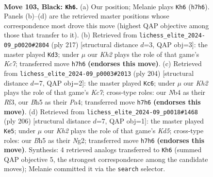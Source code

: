 \documentclass[11pt]{article}
\begin{document}
\clearpage

\begin{figure}[p]\centering
\begin{subfigure}{0.46\textwidth}\centering
\resizebox{\linewidth}{!}{%
\newchessgame
\chessboard[
  setfen={8/7k/8/7b/1n1B4/8/5P1K/8 b - - 52 103},
  showmover=false,
  pgfstyle=straightmove, color=movearrow, markmove={h7-h6}
]}
\caption{}
\end{subfigure}\hfill
\begin{subfigure}{0.46\textwidth}\centering
\resizebox{\linewidth}{!}{%
\newchessgame
\chessboard[
  setfen={8/5b2/5P2/8/1K1B4/8/2k5/8 b - - 32 109},
  showmover=false,
  pgfstyle=straightmove, color=movearrow, markmove={c2-d3}
]}
\caption{}
\end{subfigure}
\\[4pt]
\begin{subfigure}{0.46\textwidth}\centering
\resizebox{\linewidth}{!}{%
\newchessgame
\chessboard[
  setfen={8/2K5/4k3/p7/P7/5R2/3b4/8 w - - 68 103},
  showmover=false,
  pgfstyle=straightmove, color=movearrow, markmove={c7-c6}
]}
\caption{}
\end{subfigure}\hfill
\begin{subfigure}{0.46\textwidth}\centering
\resizebox{\linewidth}{!}{%
\newchessgame
\chessboard[
  setfen={8/8/8/3K4/6k1/6p1/6N1/1b6 w - - 34 104},
  showmover=false,
  pgfstyle=straightmove, color=movearrow, markmove={d5-e5}
]}
\caption{}
\end{subfigure}
\caption{\textbf{Move 103, Black: \texttt{Kh6}.} (a) Our position; Melanie plays \texttt{Kh6} (\texttt{h7h6}). Panels (b)--(d) are the retrieved master positions whose correspondence most drove this move (highest QAP objective among those that transfer to it). (b) Retrieved from \texttt{lichess\_elite\_2024-09\_p0020\#2804} (ply 217) [structural distance $d$=3, QAP obj=3]: the master played \texttt{Kd3}; under $\mu$ our \emph{Kh2} plays the role of that game's \emph{Kc7}; transferred move \texttt{h7h6} \textbf{(endorses this move)}. (c) Retrieved from \texttt{lichess\_elite\_2024-09\_p0003\#2013} (ply 204) [structural distance $d$=7, QAP obj=2]: the master played \texttt{Kc6}; under $\mu$ our \emph{Kh2} plays the role of that game's \emph{Kc7}; cross-type roles: our \emph{N}b4 as their \emph{R}f3, our \emph{B}h5 as their \emph{P}a4; transferred move \texttt{h7h6} \textbf{(endorses this move)}. (d) Retrieved from \texttt{lichess\_elite\_2024-09\_p0018\#1468} (ply 206) [structural distance $d$=7, QAP obj=1]: the master played \texttt{Ke5}; under $\mu$ our \emph{Kh2} plays the role of that game's \emph{Kd5}; cross-type roles: our \emph{B}h5 as their \emph{N}g2; transferred move \texttt{h7h6} \textbf{(endorses this move)}. Synthesis: 4 retrieved analogs transferred to \texttt{Kh6} (summed QAP objective 5, the strongest correspondence among the candidate moves); Melanie committed it via the \texttt{search} selector.}
\label{fig:thought-m205}
\end{figure}
\end{document}
